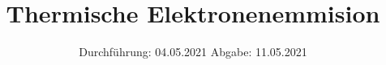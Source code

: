 

\subject{504}
\title{Thermische Elektronenemmision}
\date{%
  Durchführung: 04.05.2021
  \hspace{3em}
  Abgabe: 11.05.2021
}



\maketitle
\thispagestyle{empty}
\tableofcontents
\newpage





%

\printbibliography{}




